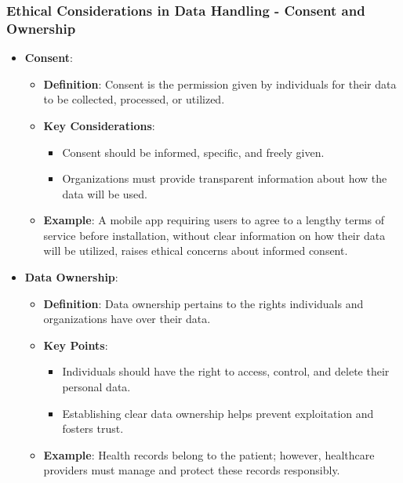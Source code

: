 \documentclass[aspectratio=169]{beamer}
\begin{document}
\begin{frame}[fragile]
    \frametitle{Ethical Considerations in Data Handling - Consent and Ownership}
    \begin{itemize}
        \item \textbf{Consent}:
            \begin{itemize}
                \item \textbf{Definition}: Consent is the permission given by individuals for their data to be collected, processed, or utilized.
                \item \textbf{Key Considerations}:
                    \begin{itemize}
                        \item Consent should be informed, specific, and freely given.
                        \item Organizations must provide transparent information about how the data will be used.
                    \end{itemize}
                \item \textbf{Example}: A mobile app requiring users to agree to a lengthy terms of service before installation, without clear information on how their data will be utilized, raises ethical concerns about informed consent.
            \end{itemize}
        \item \textbf{Data Ownership}:
            \begin{itemize}
                \item \textbf{Definition}: Data ownership pertains to the rights individuals and organizations have over their data.
                \item \textbf{Key Points}:
                    \begin{itemize}
                        \item Individuals should have the right to access, control, and delete their personal data.
                        \item Establishing clear data ownership helps prevent exploitation and fosters trust.
                    \end{itemize}
                \item \textbf{Example}: Health records belong to the patient; however, healthcare providers must manage and protect these records responsibly.
            \end{itemize}
    \end{itemize}
\end{frame}
\end{document}
